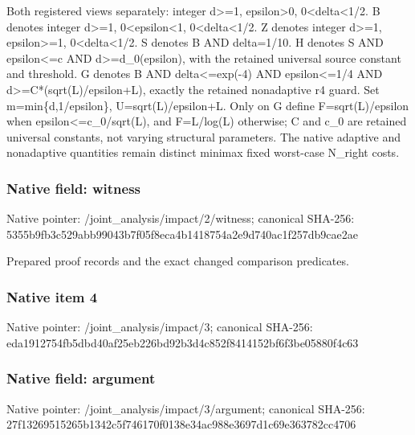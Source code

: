 \documentclass[10pt,a4paper]{article}
\begin{document}
\begingroup\raggedright\sloppy Both registered views separately:\allowbreak{} integer d>=\allowbreak{}1,\allowbreak{} epsilon>0,\allowbreak{} 0<delta<1/\allowbreak{}2. B denotes integer d>=\allowbreak{}1,\allowbreak{} 0<epsilon<1,\allowbreak{} 0<delta<1/\allowbreak{}2. Z denotes integer d>=\allowbreak{}1,\allowbreak{} epsilon>=\allowbreak{}1,\allowbreak{} 0<delta<1/\allowbreak{}2. S denotes B AND delta=\allowbreak{}1/\allowbreak{}10. H denotes S AND epsilon<=\allowbreak{}c AND d>=\allowbreak{}d\_\allowbreak{}0(epsilon),\allowbreak{} with the retained universal source constant and threshold. G denotes B AND delta<=\allowbreak{}exp(-4) AND epsilon<=\allowbreak{}1/\allowbreak{}4 AND d>=\allowbreak{}C*(sqrt(L)/\allowbreak{}epsilon+L),\allowbreak{} exactly the retained nonadaptive r4 guard. Set m=\allowbreak{}min\{d,\allowbreak{}1/\allowbreak{}epsilon\},\allowbreak{} U=\allowbreak{}sqrt(L)/\allowbreak{}epsilon+L. Only on G define F=\allowbreak{}sqrt(L)/\allowbreak{}epsilon when epsilon<=\allowbreak{}c\_\allowbreak{}0/\allowbreak{}sqrt(L),\allowbreak{} and F=\allowbreak{}L/\allowbreak{}log(L) otherwise;\allowbreak{} C and c\_\allowbreak{}0 are retained universal constants,\allowbreak{} not varying structural parameters. The native adaptive and nonadaptive quantities remain distinct minimax fixed worst-case N\_\allowbreak{}right costs.\par\endgroup

\subsubsection{Native field: witness}
Native pointer: /joint\_\allowbreak{}analysis/impact/2/witness; canonical SHA-256: 5355b9fb3c529abb99043b7f05f8eca4b1418754a2e9d740ac1f257db9cae2ae

\begingroup\raggedright\sloppy Prepared proof records and the exact changed comparison predicates.\par\endgroup

\subsubsection{Native item 4}
Native pointer: /joint\_\allowbreak{}analysis/impact/3; canonical SHA-256: eda1912754fb5dbd40af25eb226bd92b3d4c852f8414152bf6f3be05880f4c63

\subsubsection{Native field: argument}
Native pointer: /joint\_\allowbreak{}analysis/impact/3/argument; canonical SHA-256: 27f13269515265b1342c5f746170f0138e34ac988e3697d1c69e363782cc4706
\end{document}

